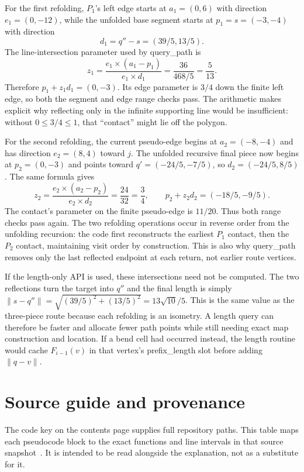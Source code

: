 \documentclass[12pt,a4paper]{article}
\newcommand{\norm}[1]{\lVert#1\rVert}
\newcommand{\cross}{\mathbin{\times}}
\newcommand{\code}[1]{{\ttfamily\color{codekw}#1}}
\begin{document}
For the first refolding, \(P_1\)'s left edge starts at \(a_1=(0,6)\) with direction \(e_1=(0,-12)\), while the unfolded base segment starts at \(p_1=s=(-3,-4)\) with direction
\[
d_1=q''-s=(39/5,13/5).
\]
The line-intersection parameter used by \code{query\_path} is
\[
z_1=\frac{e_1\cross(a_1-p_1)}{e_1\cross d_1}
=\frac{36}{468/5}=\frac5{13}.
\]
Therefore \(p_1+z_1d_1=(0,-3)\). Its edge parameter is \(3/4\) down the finite left edge, so both the segment and edge range checks pass. The arithmetic makes explicit why reflecting only in the infinite supporting line would be insufficient: without \(0\le3/4\le1\), that ``contact'' might lie off the polygon.

For the second refolding, the current pseudo-edge begins at \(a_2=(-8,-4)\) and has direction \(e_2=(8,4)\) toward \(j\). The unfolded recursive final piece now begins at \(p_2=(0,-3)\) and points toward \(q'=(-24/5,-7/5)\), so \(d_2=(-24/5,8/5)\). The same formula gives
\[
z_2=\frac{e_2\cross(a_2-p_2)}{e_2\cross d_2}
=\frac{24}{32}=\frac34,
\qquad p_2+z_2d_2=(-18/5,-9/5).
\]
The contact's parameter on the finite pseudo-edge is \(11/20\). Thus both range checks pass again. The two refolding operations occur in reverse order from the unfolding recursion: the code first reconstructs the earliest \(P_1\) contact, then the \(P_2\) contact, maintaining visit order by construction. This is also why \code{query\_path} removes only the last reflected endpoint at each return, not earlier route vertices.

If the length-only API is used, these intersections need not be computed. The two reflections turn the target into \(q''\) and the final length is simply \(\norm{s-q''}=\sqrt{(39/5)^2+(13/5)^2}=13\sqrt{10}/5\). This is the same value as the three-piece route because each refolding is an isometry. A length query can therefore be faster and allocate fewer path points while still needing exact map construction and location. If a bend cell had occurred instead, the length routine would cache \(F_{i-1}(v)\) in that vertex's \code{prefix\_length} slot before adding \(\norm{q-v}\).

\section{Source guide and provenance}
The code key on the contents page supplies full repository paths. This table maps each pseudocode block to the exact functions and line intervals in that source snapshot~\cite{code}. It is intended to be read alongside the explanation, not as a substitute for it.
\end{document}
